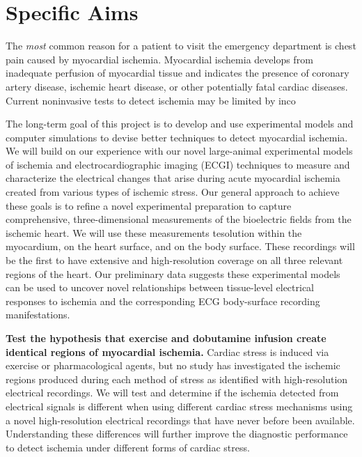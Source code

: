 %


%

\section{Specific Aims}

The \textit{most} common reason for a patient to visit the emergency
department is chest pain caused by myocardial ischemia. Myocardial ischemia
develops from inadequate perfusion of myocardial tissue and indicates the
presence of coronary artery disease, ischemic heart disease, or other
potentially fatal cardiac diseases. Current noninvasive tests to detect
ischemia may be limited by inco

The long-term goal of this project is to develop and use experimental
models and computer simulations to devise better techniques to detect
myocardial ischemia. We will build on our experience with our novel large-animal
experimental models of ischemia and electrocardiographic imaging (ECGI)
techniques to measure and characterize the electrical changes that arise
during acute myocardial ischemia created from various types of ischemic
stress. Our general approach to achieve these goals is to refine a novel
experimental preparation to capture comprehensive, three-dimensional
measurements of the bioelectric fields from the ischemic heart. We will use
these measurements tesolution
      within the myocardium, on the heart surface, and on the body
      surface. These recordings will be the first to have extensive and high-resolution coverage on all three relevant regions of the heart. Our preliminary data suggests these experimental models can
      be used to uncover novel relationships between tissue-level
      electrical responses to ischemia and the corresponding ECG
      body-surface recording manifestations.
	
    \item [Aim 2:] \textbf{Test the hypothesis that exercise and dobutamine
        infusion create identical regions of myocardial ischemia.} Cardiac
      stress is induced via exercise or pharmacological agents, but no
      study has investigated the ischemic regions produced during each
      method of stress as identified with high-resolution electrical recordings. We will test and determine if the ischemia detected
      from electrical signals is different when using different cardiac
      stress mechanisms using a novel high-resolution electrical recordings
      that have never before been available. Understanding these
      differences will further improve the diagnostic performance to detect
      ischemia under different forms of cardiac stress.
	
